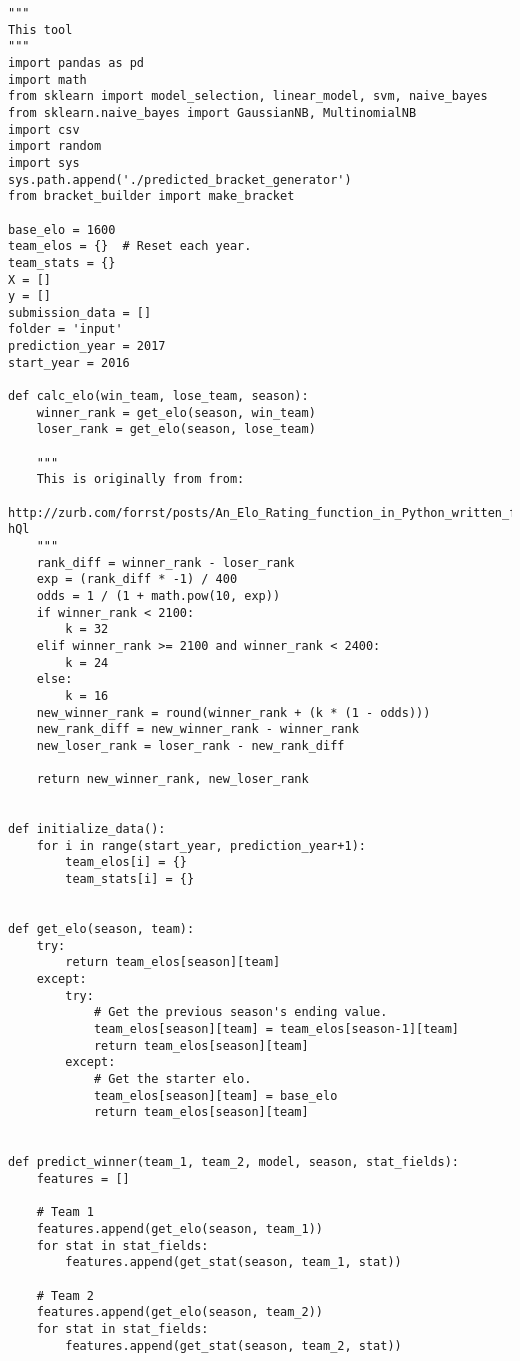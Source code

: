 \documentclass[onecolumn, draftclsnofoot,10pt, compsoc]{IEEEtran}
\begin{document}
\begin{lstlisting}[caption={mm.py, where basketball statistics are read and fed into Scikit-Learn machine learning algorithms. Then, the resulting March Madness bracket is generated.}]
"""
This tool
"""
import pandas as pd
import math
from sklearn import model_selection, linear_model, svm, naive_bayes
from sklearn.naive_bayes import GaussianNB, MultinomialNB
import csv
import random
import sys
sys.path.append('./predicted_bracket_generator')
from bracket_builder import make_bracket

base_elo = 1600
team_elos = {}  # Reset each year.
team_stats = {}
X = []
y = []
submission_data = []
folder = 'input'
prediction_year = 2017
start_year = 2016

def calc_elo(win_team, lose_team, season):
    winner_rank = get_elo(season, win_team)
    loser_rank = get_elo(season, lose_team)

    """
    This is originally from from:
    http://zurb.com/forrst/posts/An_Elo_Rating_function_in_Python_written_for_foo-hQl
    """
    rank_diff = winner_rank - loser_rank
    exp = (rank_diff * -1) / 400
    odds = 1 / (1 + math.pow(10, exp))
    if winner_rank < 2100:
        k = 32
    elif winner_rank >= 2100 and winner_rank < 2400:
        k = 24
    else:
        k = 16
    new_winner_rank = round(winner_rank + (k * (1 - odds)))
    new_rank_diff = new_winner_rank - winner_rank
    new_loser_rank = loser_rank - new_rank_diff

    return new_winner_rank, new_loser_rank


def initialize_data():
    for i in range(start_year, prediction_year+1):
        team_elos[i] = {}
        team_stats[i] = {}


def get_elo(season, team):
    try:
        return team_elos[season][team]
    except:
        try:
            # Get the previous season's ending value.
            team_elos[season][team] = team_elos[season-1][team]
            return team_elos[season][team]
        except:
            # Get the starter elo.
            team_elos[season][team] = base_elo
            return team_elos[season][team]


def predict_winner(team_1, team_2, model, season, stat_fields):
    features = []

    # Team 1
    features.append(get_elo(season, team_1))
    for stat in stat_fields:
        features.append(get_stat(season, team_1, stat))

    # Team 2
    features.append(get_elo(season, team_2))
    for stat in stat_fields:
        features.append(get_stat(season, team_2, stat))


\end{lstlisting}
\end{document}

